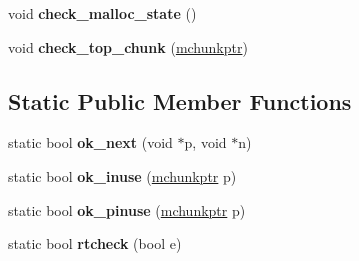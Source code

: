 \begin{DoxyCompactItemize}
\item 
void {\bfseries check\+\_\+malloc\+\_\+state} ()\hypertarget{classspp_1_1malloc__state_a59e36d521dda8eaea2f5f403601b839c}{}\label{classspp_1_1malloc__state_a59e36d521dda8eaea2f5f403601b839c}

\item 
void {\bfseries check\+\_\+top\+\_\+chunk} (\hyperlink{structspp_1_1malloc__chunk}{mchunkptr})\hypertarget{classspp_1_1malloc__state_ac74ba71b3339afbe63e679e279b8dbc9}{}\label{classspp_1_1malloc__state_ac74ba71b3339afbe63e679e279b8dbc9}

\end{DoxyCompactItemize}
\subsection*{Static Public Member Functions}
\begin{DoxyCompactItemize}
\item 
static bool {\bfseries ok\+\_\+next} (void $\ast$p, void $\ast$n)\hypertarget{classspp_1_1malloc__state_a51a292c6f86cd146896de41782663473}{}\label{classspp_1_1malloc__state_a51a292c6f86cd146896de41782663473}

\item 
static bool {\bfseries ok\+\_\+inuse} (\hyperlink{structspp_1_1malloc__chunk}{mchunkptr} p)\hypertarget{classspp_1_1malloc__state_a5ef4a52faff6174f6f2b9f1498accef8}{}\label{classspp_1_1malloc__state_a5ef4a52faff6174f6f2b9f1498accef8}

\item 
static bool {\bfseries ok\+\_\+pinuse} (\hyperlink{structspp_1_1malloc__chunk}{mchunkptr} p)\hypertarget{classspp_1_1malloc__state_ac632bdc37e967a3700f03a96d7cfbdfa}{}\label{classspp_1_1malloc__state_ac632bdc37e967a3700f03a96d7cfbdfa}

\item 
static bool {\bfseries rtcheck} (bool e)\hypertarget{classspp_1_1malloc__state_a6183f88aca62e7450fa22a9bc3912fd0}{}\label{classspp_1_1malloc__state_a6183f88aca62e7450fa22a9bc3912fd0}

\end{DoxyCompactItemize}
